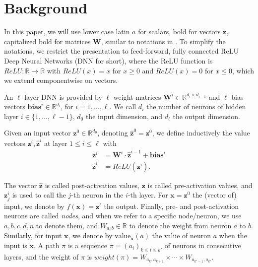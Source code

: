 \documentclass{llncs}
\newcommand{\vz}{\boldsymbol{z}}
\newcommand{\vb}{\boldsymbol{bias}}
\newcommand{\val}{{\textrm{value}}}
\begin{document}



\section{Background}

In this paper, we will use lower case latin $a$ for scalars, bold for vectors $\boldsymbol{z}$, 
capitalized bold for matrices $\boldsymbol{W}$, similar to notations in \cite{prima,crown}.
To simplify the notations, we restrict the presentation to feed-forward, 
fully connected ReLU Deep Neural Networks (DNN for short), where the ReLU function is $ReLU : \mathbb{R} \rightarrow \mathbb{R}$ with
$ReLU(x)=x$ for $x \geq 0$ and $ReLU(x)=0$ for $x \leq 0$, which we extend componentwise on vectors.




An $\ell$-layer DNN is provided by $\ell$ weight matrices 
$\boldsymbol{W}^i \in \mathbb{R}^{d_i\times d_{i-1}}$
and $\ell$ bias vectors $\vb^i \in \mathbb{R}^{d_i}$, for $i=1, \ldots, \ell$.
We call $d_i$ the number of neurons of hidden layer $i \in \{1, \ldots, \ell-1\}$,
$d_0$ the input dimension, and $d_\ell$ the output dimension.

Given an input vector $\boldsymbol{z}^0 \in \mathbb{R}^{d_0}$, 
denoting $\hat{\boldsymbol{z}}^{0}={\boldsymbol{z}}^0$, we define inductively the value vectors $\boldsymbol{z}^i,\hat{\vz}^i$ at layer $1 \leq i \leq \ell$ with
\begin{align*}
	{\boldsymbol{z}}^{i} &= \boldsymbol{W}^i\cdot \hat{\boldsymbol{z}}^{i-1}+ \vb^i\\
	\hat{\boldsymbol{z}}^{i} &= ReLU({\boldsymbol{z}}^i).
\end{align*} 

The vector $\hat{\boldsymbol{z}}$ is called post-activation values, 
$\boldsymbol{z}$ is called pre-activation values, 
and $\boldsymbol{z}^{i}_j$ is used to call the $j$-th neuron in the $i$-th layer. 
For $\boldsymbol{x}=\vz^0$ the (vector of) input, we denote by $f(\boldsymbol{x})=\vz^\ell$ the output. Finally, pre- and post-activation neurons are called \emph{nodes}, and when we refer to a specific node/neuron, we use $a,b,c,d,n$ to denote them, and $W_{a,b} \in \mathbb{R}$ to denote the weight from neuron $a$ to $b$. Similarly, for input $\boldsymbol{x}$, we denote by $\val_{\boldsymbol{x}}(a)$ the value of neuron $a$ when the input is $\boldsymbol{x}$. A path $\pi$ is a sequence $\pi=(a_i)_{k \leq  i \leq k'}$ of neurons in consecutive layers, and the weight of $\pi$ is 
$weight(\pi)=W_{a_k,a_{k+1}} \times \cdots \times  W_{a_{k'-1},a_{k'}}$.
\end{document}
